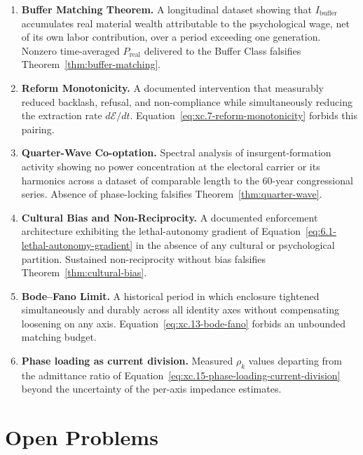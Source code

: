 \begin{enumerate}
    \item \textbf{Buffer Matching Theorem.} A longitudinal dataset showing that $I_{\text{buffer}}$
    accumulates real material wealth attributable to the psychological wage, net of its own labor
    contribution, over a period exceeding one generation. Nonzero time-averaged $P_{\text{real}}$
    delivered to the Buffer Class falsifies Theorem~\ref{thm:buffer-matching}.

    \item \textbf{Reform Monotonicity.} A documented intervention that measurably reduced backlash,
    refusal, and non-compliance while simultaneously reducing the extraction rate
    $d\mathcal{E}/dt$. Equation~\ref{eq:xc.7-reform-monotonicity} forbids this pairing.

    \item \textbf{Quarter-Wave Co-optation.} Spectral analysis of insurgent-formation activity
    showing no power concentration at the electoral carrier or its harmonics across a dataset of
    comparable length to the 60-year congressional series. Absence of phase-locking falsifies
    Theorem~\ref{thm:quarter-wave}.

    \item \textbf{Cultural Bias and Non-Reciprocity.} A documented enforcement architecture
    exhibiting the lethal-autonomy gradient of
    Equation~\ref{eq:6.1-lethal-autonomy-gradient} in the absence of any cultural or
    psychological partition. Sustained non-reciprocity without bias falsifies
    Theorem~\ref{thm:cultural-bias}.

    \item \textbf{Bode--Fano Limit.} A historical period in which enclosure tightened simultaneously
    and durably across all identity axes without compensating loosening on any axis.
    Equation~\ref{eq:xc.13-bode-fano} forbids an unbounded matching budget.

    \item \textbf{Phase loading as current division.} Measured $\rho_k$ values departing from the
    admittance ratio of Equation~\ref{eq:xc.15-phase-loading-current-division} beyond the
    uncertainty of the per-axis impedance estimates.
\end{enumerate}

\section{Open Problems}
\label{sec:xc_open}

